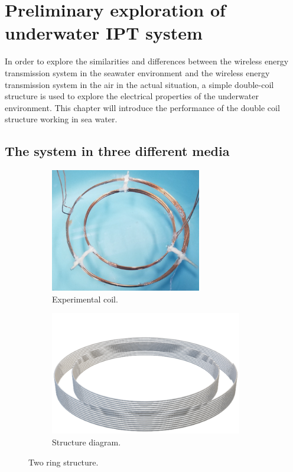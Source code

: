 \chapter{Preliminary exploration of underwater IPT system}

In order to explore the similarities and differences between the wireless energy transmission system in the seawater environment and the wireless energy transmission system in the air in the actual situation, a simple double-coil structure is used to explore the electrical properties of the underwater environment. This chapter will introduce the performance of the double coil structure working in sea water.




\section{The system in three different media}

\begin{figure}[!b]
    \begin{subfigure}{0.5\textwidth}
        \centering
        \includegraphics[width=0.9\linewidth, height=5.4cm]{images/3_two_ring_coil.png}
        \caption{Experimental coil.}
        \label{fig:subim1}
    \end{subfigure}
    \begin{subfigure}{0.5\textwidth}
        \centering
        \includegraphics[width=0.9\linewidth, height=5.4cm]{images/3_two_ring_coil_structure.png}
        \caption{Structure diagram.}
        \label{fig:subim2}
    \end{subfigure}

    \caption{Two ring structure.}
    \label{fig:3_two_ring_coil}
\end{figure}

